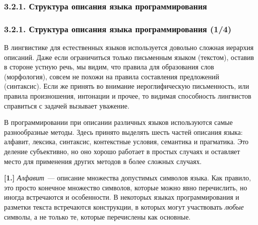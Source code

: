 \documentclass[mathserif,12pt,aspectratio=169]{beamer}
\def\emразделенной{\em разделенной}
\renewcommand{\index}[1]{}
\def\em#1{\it\color{blue}#1}
\def\odmkey#1#2{{\it\color{red} #1}\index{#2}}
\begin{document}
\subsubsection{3.2.1. Структура описания языка программирования}
\begin{frame}
\frametitle{3.2.1. Структура описания языка программирования (1/4)}
В лингвистике для естественных языков используется довольно сложная
иерархия описаний. Даже если ограничиться только письменным языком
(текстом), оставив в стороне устную речь, мы видим,
что правила для образования слов (морфология),
совсем не похожи на правила составления предложений
(синтаксис). Если же принять во внимание иероглифическую письменность,
или правила произношения, интонации и прочее, 
то видимая способность лингвистов справиться с задачей
вызывает уважение.   

\smallskip
В программировании при описании различных языков используются самые 
разнообразные методы. Здесь принято выделять
шесть частей описания языка: алфавит, лексика, синтаксис, контекстные условия, семантика и прагматика. Это деление субъективно, но оно
хорошо работает в простых случаях и оставляет место для
применения других методов в более сложных случаях.

\smallskip
{\color{blue}\bf [1.]} \odmkey{Алфавит}{Алфавит}~--- описание множества допустимых символов языка. Как
правило, это просто конечное множество символов, которые можно
явно перечислить, но иногда встречаются и особенности. В некоторых
языках программирования и разметки текста встречаются конструкции,
в которых могут участвовать {\em любые} символы, а не только те,
которые перечислены как основные.

\end{frame}
\end{document}
